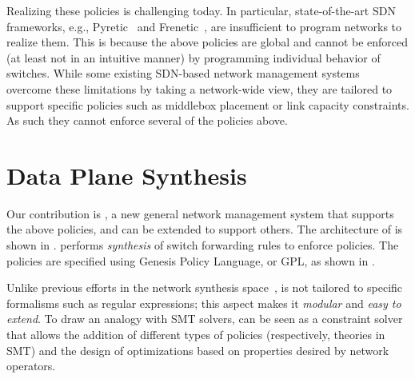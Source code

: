 \begin{compactitemize}
\end{compactitemize}


\noindent Realizing these policies  is challenging today.
In particular, state-of-the-art SDN frameworks, e.g., Pyretic~\cite{}
and Frenetic~\cite{}, are insufficient to program networks to realize
them.  This is because the above policies are global and
cannot be enforced (at least not in an intuitive manner) by
programming individual behavior of switches.  While some existing
SDN-based network management systems~\cite{simple,merlin,oneswitch}
overcome these limitations by taking a network-wide view, they are
tailored to support specific policies such as middlebox placement or
link capacity constraints. As such they cannot enforce several of the
policies above.


\section{Data Plane Synthesis} \label{sec:synthesis} 

Our contribution is \name, a new general network management system
that supports the above policies, and can be extended
to support others. The architecture of \name is shown in
. \Name performs {\em synthesis} of switch
forwarding rules to enforce policies. The policies are
specified using Genesis Policy Language, or GPL, as shown in
.

Unlike previous efforts in the network synthesis
space~\cite{netgen,merlin}, \Name is not tailored to specific
formalisms such as regular expressions; this aspect makes it {\em
  modular} and {\em easy to extend}.
To draw an analogy with SMT solvers, \Name can be seen as a constraint
solver that allows the addition of different types of policies
(respectively, theories in SMT) and the design of
optimizations based on properties desired by network
  operators. 
  
